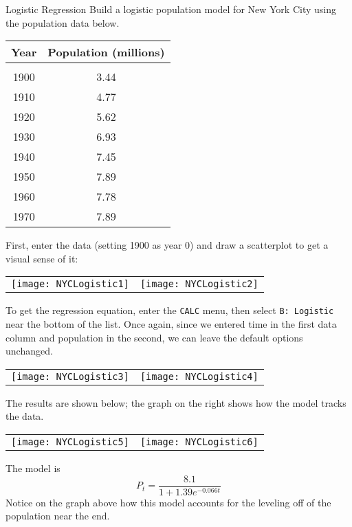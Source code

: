 \begin{example}[https://www.youtube.com/watch?v=7gXNhLY1Yyc&list=PLfmpjsIzhztutjEb8Pg5OBOlI1p80yVoy&index=15]{Logistic Regression}
Build a logistic population model for New York City using the population data below.
\begin{center}
\begin{tabular}{c c}
\textbf{Year} & \textbf{Population (millions)}\\
\hline
& \\
1900 & 3.44\\
1910 & 4.77\\
1920 & 5.62\\ 
1930 & 6.93\\
1940 & 7.45\\
1950 & 7.89\\
1960 & 7.78\\
1970 & 7.89\\
\end{tabular}
\end{center}

\sol
First, enter the data (setting 1900 as year 0) and draw a scatterplot to get a visual sense of it:
\begin{center}
\begin{tabular}{c c}
\texttt{[image: NYCLogistic1]}
& \texttt{[image: NYCLogistic2]}
\end{tabular}
\end{center}

To get the regression equation, enter the  \texttt{CALC} menu, then select \texttt{B: Logistic} near the bottom of the list.  Once again, since we entered time in the first data column and population in the second, we can leave the default options unchanged.
\begin{center}
\begin{tabular}{c c}
\texttt{[image: NYCLogistic3]}
& \texttt{[image: NYCLogistic4]}
\end{tabular}
\end{center} 

The results are shown below; the graph on the right shows how the model tracks the data.
\begin{center}
\begin{tabular}{c c}
\texttt{[image: NYCLogistic5]}
& \texttt{[image: NYCLogistic6]}
\end{tabular}
\end{center}
The model is \[\boxed{P_t = \dfrac{8.1}{1+1.39e^{-0.066t}}}\]
Notice on the graph above how this model accounts for the leveling off of the population near the end.
\end{example}